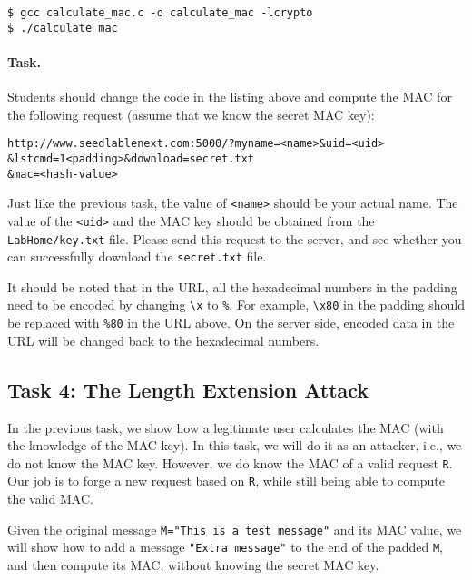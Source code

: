 \begin{lstlisting}
$ gcc calculate_mac.c -o calculate_mac -lcrypto
$ ./calculate_mac 
\end{lstlisting}


\paragraph{Task.}
Students should change the code in the listing above and compute 
the MAC for the following request (assume that we know
the secret MAC key):

\begin{lstlisting}
http://www.seedlablenext.com:5000/?myname=<name>&uid=<uid>
&lstcmd=1<padding>&download=secret.txt
&mac=<hash-value>
\end{lstlisting}

Just like the previous task, the value of \texttt{<name>} should be your actual name. 
The value of the \texttt{<uid>} and the MAC key should be 
obtained from the \texttt{LabHome/key.txt} file.
Please send this request to the server, and see whether you can
successfully download the \texttt{secret.txt} file.  

It should be noted that in the URL, 
all the hexadecimal numbers in the padding 
need to be encoded by changing
\texttt{\textbackslash x} to \texttt{\%}. For example, 
\texttt{\textbackslash x80} in the padding should be 
replaced with \texttt{\%80} in the URL above. 
On the server side, encoded data in the URL 
will be changed back to the hexadecimal numbers. 


\subsection{Task 4: The Length Extension Attack}


In the previous task, we show how a legitimate user calculates the MAC (with
the knowledge of the MAC key). In this task, we will do it as an attacker,
i.e., we do not know the MAC key. However, we do know the MAC of a valid 
request \texttt{R}. Our job is to forge a new request based on \texttt{R},
while still being able to compute the valid MAC. 

Given the original message \texttt{M="This is a test message"} and its 
MAC value, we will show how to add a message 
\texttt{"Extra message"} to the end of the padded \texttt{M}, and 
then compute its MAC, without knowing the secret MAC key. 

